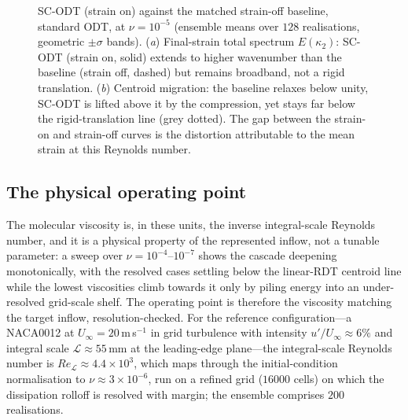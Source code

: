 \documentclass[11pt,a4paper]{article}
\begin{document}
\begin{figure}
  \centering
  \caption{SC-ODT (strain on) against the matched strain-off baseline,
  standard ODT, at
  $\nu=10^{-5}$ (ensemble means over $128$ realisations, geometric
  $\pm\sigma$ bands). (\textit{a}) Final-strain total spectrum
  $E(\kappa_2)$: SC-ODT (strain on, solid) extends to higher wavenumber
  than the baseline (strain off, dashed) but remains broadband, not a
  rigid translation. (\textit{b}) Centroid migration: the baseline relaxes
  below unity, SC-ODT is lifted above it by the compression, yet
  stays far below the rigid-translation line (grey dotted). The gap
  between the strain-on and strain-off curves is the distortion
  attributable to the mean strain at this Reynolds number.}
  \label{fig:spec-bvc}
\end{figure}

\subsection{The physical operating point}\label{sec:spec-op}

The molecular viscosity is, in these units, the inverse integral-scale
Reynolds number, and it is a physical property of the represented
inflow, not a tunable parameter: a sweep over
$\nu=10^{-4}$--$10^{-7}$ shows the cascade deepening monotonically, with
the resolved cases settling below the linear-RDT centroid line while the
lowest viscosities climb towards it only by piling energy into an
under-resolved grid-scale shelf. The operating point is therefore the
viscosity matching the target inflow, resolution-checked. For the
reference configuration---a NACA0012 at $U_\infty=20$\,m\,s$^{-1}$ in
grid turbulence with intensity $u'/U_\infty\approx6\%$ and integral
scale $\mathcal{L}\approx55$\,mm at the leading-edge plane---the
integral-scale Reynolds number is
$Re_{\mathcal{L}}\approx4.4\times10^3$, which maps through the
initial-condition normalisation to $\nu\approx3\times10^{-6}$, run on a
refined grid ($16000$ cells) on which the dissipation rolloff is
resolved with margin; the ensemble comprises $200$ realisations.
\end{document}
